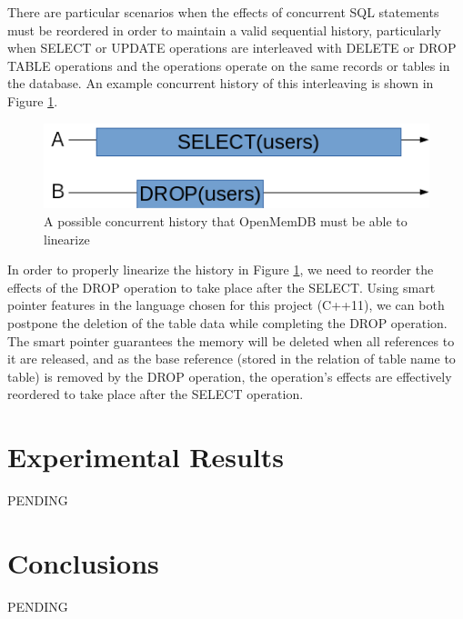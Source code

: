 \documentclass[letter,11pt]{article}
\begin{document}
\par\vspace{\baselineskip}
There are particular scenarios when the effects of concurrent SQL statements must be reordered
in order to maintain a valid sequential history, particularly when SELECT or UPDATE operations
are interleaved with DELETE or DROP TABLE operations and the operations operate on the same 
records or tables in the database. An example concurrent history of this interleaving is shown in 
Figure \ref{concurrent_history}.

\begin{figure}[h]
  \includegraphics{concurrent_history_1}
  \caption{A possible concurrent history that OpenMemDB must be able to linearize}
  \label{concurrent_history}
\end{figure}

\par\vspace{\baselineskip}
In order to properly linearize the history in Figure \ref{concurrent_history}, we need to reorder 
the effects of the DROP operation to take place after the SELECT. Using smart pointer features 
in the language chosen for this project (C++11), we can both postpone the deletion of the 
table data while completing the DROP operation. The smart pointer guarantees the memory will 
be deleted when all references to it are released, and as the base reference (stored in the 
relation of table name to table) is removed by the DROP operation, the operation's effects 
are effectively reordered to take place after the SELECT operation.

\section{Experimental Results}
PENDING

\section{Conclusions}
PENDING

\newpage


\newpage
\end{document}
